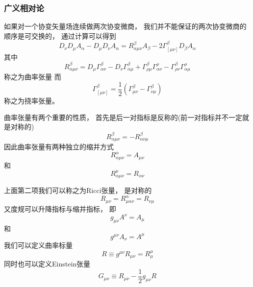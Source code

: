 \documentclass[8pt]{beamer}
\begin{document}
        \begin{frame}[fragile]
            \frametitle{广义相对论}
            \begin{multicols}{2} 
                \qquad
                如果对一个协变矢量场连续做两次协变微商，
                我们并不能保证的两次协变微商的顺序是可交换的，
                通过计算可以得到
                $$D_{\nu}D_{\mu}A_{\alpha}-D_{\mu}D_{\nu}A_{\alpha}=R^{\beta}_{\alpha\mu\nu}
                A_{\beta}-2\varGamma^{\beta}_{[\mu\nu]}D_{\beta}A_{\alpha}$$
                其中
                $$R^{\beta}_{\alpha\mu\nu}=D_{\mu}\varGamma^{\beta}_{\alpha\nu}-
                D_{\nu}\varGamma^{\beta}_{\alpha\mu}+\varGamma^{\beta}_{\rho\mu}\varGamma^{\rho}_{\alpha\nu}
                -\varGamma^{\beta}_{\rho\nu}\varGamma^{\rho}_{\alpha\mu}$$
                称之为曲率张量
                而
                $$\varGamma^{\beta}_{[\mu\nu]}=\frac{1}{2}(\varGamma^{\beta}_{\mu\nu}-\varGamma^{\beta}_{\nu\mu})$$
                称之为挠率张量。

                \qquad
                曲率张量有两个重要的性质，
                首先是后一对指标是反称的(前一对指标并不一定就是对称的)
                $$R^{\beta}_{\alpha\mu\nu}=-R^{\beta}_{\alpha\nu\mu}$$
                因此曲率张量有两种独立的缩并方式
                $$R^{\alpha}_{\alpha\mu\nu}=A_{\mu\nu}$$
                和
                $$R^{\mu}_{\alpha\mu\nu}=R_{\alpha\nu}$$

                \qquad
                上面第二项我们可以称之为Ricci张量，
                是对称的
                $$R_{\mu\nu}=R^{\alpha}_{\mu\alpha\nu}=R_{\nu\mu}$$
                又度规可以升降指标与缩并指标，
                即$$g_{\mu\nu}A^{\nu}=A_{\mu}$$
                和$$g^{\mu\nu}A_{\nu}=A^{\mu}$$
                我们可以定义曲率标量
                $$R\equiv g^{\mu\nu}R_{\mu\nu}=R^{\mu}_{\mu}$$
                同时也可以定义Einstein张量
                $$G_{\mu\nu}\equiv R_{\mu\nu}-\frac{1}{2}g_{\mu\nu}R$$

                
            \end{multicols}
        \end{frame}
\end{document}
